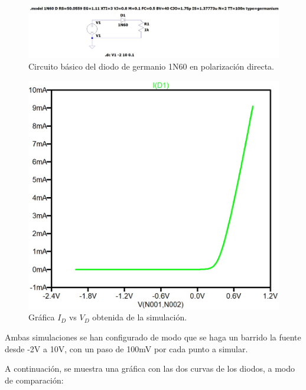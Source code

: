 \documentclass[chaptersright]{informeutn}
\begin{document}
    \begin{figure}[H]
        \centering
        \includegraphics[width=\linewidth]{pictures/curva_diodo_germanio_circuito.jpeg}
        \caption{Circuito básico del diodo de germanio 1N60 en polarización directa.}
    \end{figure}
    \begin{figure}[H]
        \centering
        \includegraphics[width=0.5\linewidth]{pictures/curva_diodo_germanio_grafico.jpeg}
        \caption{Gráfica $I_D$ vs $V_D$ obtenida de la simulación.}

    \end{figure}

    Ambas simulaciones se han configurado de modo que se haga un barrido la fuente desde -2V a 10V, con un paso de 100mV 
    por cada punto a simular.

    A continuación, se muestra una gráfica con las dos curvas de los diodos, a modo de comparación:
\end{document}
